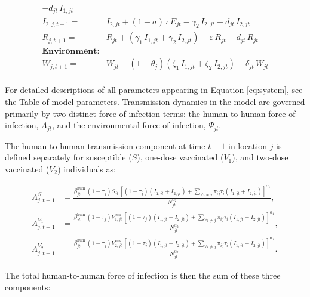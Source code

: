 \documentclass[
]{book}
\begin{document}
\begin{equation}
\begin{aligned}
- d_{jt}\,I_{1,jt}\\[3mm]
I_{2,j,t+1} = \ &
I_{2,jt} 
+ \left(1-\sigma\right)\,\iota\,E_{jt} 
- \gamma_2\,I_{2,jt} 
- d_{jt}\,I_{2,jt}\\[3mm]
R_{j,t+1} = \ &
R_{jt} 
+ \left( \gamma_1\,I_{1,jt} + \gamma_2\,I_{2,jt} \right) 
- \varepsilon\,R_{jt} 
- d_{jt}\,R_{jt}\\[5mm]
\mathbf{\text{Environment:}}\\[3mm]
W_{j,t+1} = \ &
W_{jt} 
+ \left(1-\theta_j\right)\left( \zeta_1\,I_{1,jt} + \zeta_2\,I_{2,jt} \right) 
- \delta_{jt}\,W_{jt}\\[3mm]
\end{aligned}
\label{eq:system}
\end{equation}

For detailed descriptions of all parameters appearing in Equation \eqref{eq:system}, see the \hyperref[parameters-table]{Table of model parameters}. Transmission dynamics in the model are governed primarily by two distinct force-of-infection terms: the human-to-human force of infection, \(\Lambda_{jt}\), and the environmental force of infection, \(\Psi_{jt}\).

The human-to-human transmission component at time \(t+1\) in location \(j\) is defined separately for susceptible (\(S\)), one-dose vaccinated (\(V_1\)), and two-dose vaccinated (\(V_2\)) individuals as:

\begin{equation}
\begin{aligned}
\Lambda^S_{j,t+1} &= \frac{
\beta_{jt}^{\text{hum}} \, (1-\tau_{j})S_{jt} \, \left[ (1-\tau_{j}) (I_{1,jt} + I_{2,jt}) + \sum_{\forall i \neq j} \pi_{ij}\tau_i(I_{1,jt} + I_{2,jt}) \right]^{\alpha_1}}{N_{jt}^{\alpha_2}},\\[4mm]
\Lambda^{V_1}_{j,t+1} &= \frac{
\beta_{jt}^{\text{hum}} \, (1-\tau_{j})V^{\text{sus}}_{1,jt}  \, \left[ (1-\tau_{j})(I_{1,jt} + I_{2,jt}) + \sum_{\forall i \neq j} \pi_{ij}\tau_i(I_{1,jt} + I_{2,jt}) \right]^{\alpha_1}}{N_{jt}^{\alpha_2}},\\[4mm]
\Lambda^{V_2}_{j,t+1} &= \frac{
\beta_{jt}^{\text{hum}} \, (1-\tau_{j})V^{\text{sus}}_{2,jt} \, \left[ (1-\tau_{j})(I_{1,jt} + I_{2,jt}) + \sum_{\forall i \neq j} \pi_{ij}\tau_i(I_{1,jt} + I_{2,jt}) \right]^{\alpha_1}}{N_{jt}^{\alpha_2}}.
\end{aligned}
\label{eq:foi-human}
\end{equation}

The total human-to-human force of infection is then the sum of these three components:
\end{document}
